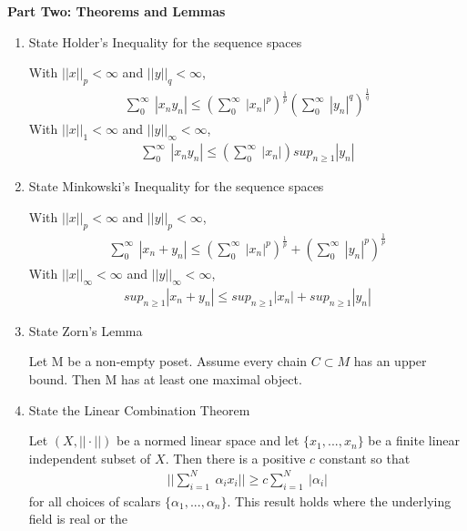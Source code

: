 \documentclass[11pt]{SelfArxOneColBMN}
\begin{document}
\textbf{Part Two: Theorems and Lemmas}
\begin{enumerate}
  \item State Holder's Inequality for the sequence spaces
  \begin{solution}
    With $||x||_p < \infty$ and $||y||_q < \infty$,
    \begin{eqnarray*}
      \sum_0^{\infty}\:|x_ny_n| \leq (\sum_0^{\infty}\:|x_n|^p)^\frac{1}{p}(\sum_0^{\infty}\:|y_n|^q)^{\frac{1}{q}}
    \end{eqnarray*}
    With $||x||_1 < \infty$ and $||y||_{\infty} < \infty$,
    \begin{eqnarray*}
      \sum_0^{\infty}\:|x_ny_n| \leq (\sum_0^{\infty}\:|x_n|)sup_{n \geq 1}|y_n|
    \end{eqnarray*}
  \end{solution}
  \item State Minkowski's Inequality for the sequence spaces
  \begin{solution}
    With $||x||_p < \infty$ and $||y||_p < \infty$,
    \begin{eqnarray*}
      \sum_0^{\infty}\:|x_n + y_n| \leq (\sum_0^{\infty}\:|x_n|^p)^\frac{1}{p} + (\sum_0^{\infty}\:|y_n|^p)^{\frac{1}{p}}
    \end{eqnarray*}
    With $||x||_{\infty} < \infty$ and $||y||_{\infty} < \infty$,
    \begin{eqnarray*}
      sup_{n \geq 1}|x_n + y_n| \leq sup_{n \geq 1}|x_n| + sup_{n \geq 1}|y_n|
    \end{eqnarray*}
  \end{solution}
  \item State Zorn's Lemma
  \begin{solution}
    Let M be a non-empty poset. Assume every chain $C \subset M$ has an upper bound. Then M has at least one maximal object.
  \end{solution}
  \item State the Linear Combination Theorem
  \begin{solution}
    Let $(X,||\cdot||)$ be a normed linear space and let $\{x_1,...,x_n\}$ be a finite linear independent subset of $X$. Then there is a positive ${c}$ constant so that 
    \begin{eqnarray*}
      ||\sum_{i=1}^N\: \alpha_i {x_i}|| \geq c\sum_{i=1}^N\:|\alpha_i|
    \end{eqnarray*}
    for all choices of scalars $\{\alpha_1,...,\alpha_n\}$. This result holds where the underlying field is real or the
  \end{solution}

\end{enumerate}
\end{document}
